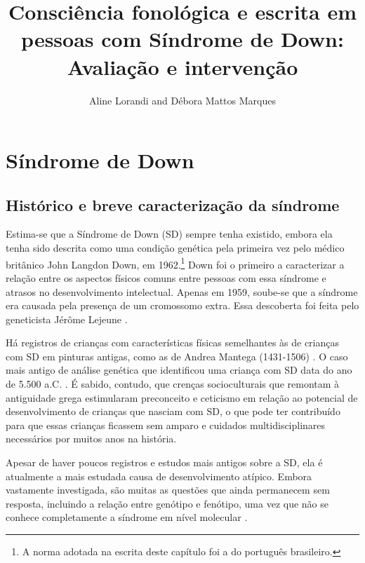 \documentclass[output=paper,colorlinks,citecolor=brown,booklanguage=portuguese]{langscibook}
\title{Consciência fonológica e escrita em pessoas com Síndrome de Down: Avaliação e intervenção}
\author{Aline Lorandi \affiliation{Universidade Feevale, Programa de Pós-graduação em Diversidade Cultural e Inclusão Social } and  Débora Mattos Marques\affiliation{União Espírita Bageense Caminho da Luz, SOMA - Serviço e Orientação Multidisciplinar de Aprendizagem}}
\begin{document}
\maketitle

\section{Síndrome de Down}

\subsection{Histórico e breve caracterização da síndrome}

Estima-se que a Síndrome de Down (SD) sempre tenha existido, embora ela tenha sido descrita como uma condição genética pela primeira vez pelo médico britânico John Langdon Down, em 1962.\footnote{A norma adotada na escrita deste capítulo foi a do português brasileiro.}
Down foi o primeiro a caracterizar a relação entre os aspectos físicos comuns entre pessoas com essa síndrome e atrasos no desenvolvimento intelectual. Apenas em 1959, soube-se que a síndrome era causada pela presença de um cromossomo extra. Essa descoberta foi feita pelo geneticista Jérôme Lejeune \citep{Schwartzman1999}.

Há registros de crianças com características físicas semelhantes às de crianças com SD em pinturas antigas, como as de Andrea Mantega (1431-1506) \citep{Schwartzman1999}. O caso mais antigo de análise genética que identificou uma criança com SD data do ano de 5.500 a.C. \citep{RTENews2020}. É sabido, contudo, que crenças socioculturais que remontam à antiguidade grega \citep{Aranha2001} estimularam preconceito e ceticismo em relação ao potencial de desenvolvimento de crianças que nasciam com SD, o que pode ter contribuído para que essas crianças ficassem sem amparo e cuidados multidisciplinares necessários por muitos anos na história.

Apesar de haver poucos registros e estudos mais antigos sobre a SD, ela é atualmente a mais estudada causa de desenvolvimento atípico. Embora vastamente investigada, são muitas as questões que ainda permanecem sem resposta, incluindo a relação entre genótipo e fenótipo, uma vez que não se conhece completamente a síndrome em nível molecular \citep{Lanfranchi2019}.
\end{document}

